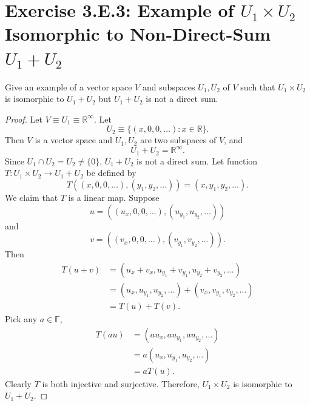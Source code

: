 \section{Exercise 3.E.3: Example of $U_1\times U_2$ Isomorphic to Non-Direct-Sum $U_1+U_2$}
Give an example of a vector space $V$ and subspaces $U_1,U_2$ of $V$ such that $U_1\times U_2$ is isomorphic to $U_1+U_2$ but $U_1+U_2$ is not a direct sum.
\begin{proof}
Let $V\equiv U_1\equiv\mathbb{R}^\infty$. Let\[
U_2\equiv\{(x,0,0,\dots):x\in\mathbb{R}\}.
\]Then $V$ is a vector space and $U_1,U_2$ are two subspaces of $V$, and\[
U_1+U_2=\mathbb{R}^\infty.
\]Since $U_1\cap U_2=U_2\ne\{0\}$, $U_1+U_2$ is not a direct sum. Let function $T: U_1\times U_2\to U_1+U_2$ be defined by\[
T((x,0,0,\dots),(y_1,y_2,\dots))=(x,y_1,y_2,\dots).
\]We claim that $T$ is a linear map. Suppose\[
u=((u_x,0,0,\dots),(u_{y_1},u_{y_2},\dots))
\]and\[
v=((v_x,0,0,\dots),(v_{y_1},v_{y_2},\dots)).
\]Then\[
\begin{split}
T(u+v)&=(u_x+v_x,u_{y_1}+v_{y_1},u_{y_2}+v_{y_2},\dots)\\
&=(u_x,u_{y_1},u_{y_2},\dots)+(v_x,v_{y_1},v_{y_2},\dots)\\
&=T(u)+T(v).
\end{split}
\]Pick any $a\in\mathbb{F}$,\[
\begin{split}
T(au)&=(au_x,au_{y_1},au_{y_2},\dots)\\
&=a(u_x,u_{y_1},u_{y_2},\dots)\\
&=aT(u).
\end{split}
\]Clearly $T$ is both injective and surjective. Therefore, $U_1\times U_2$ is isomorphic to $U_1+U_2$.
\end{proof}
